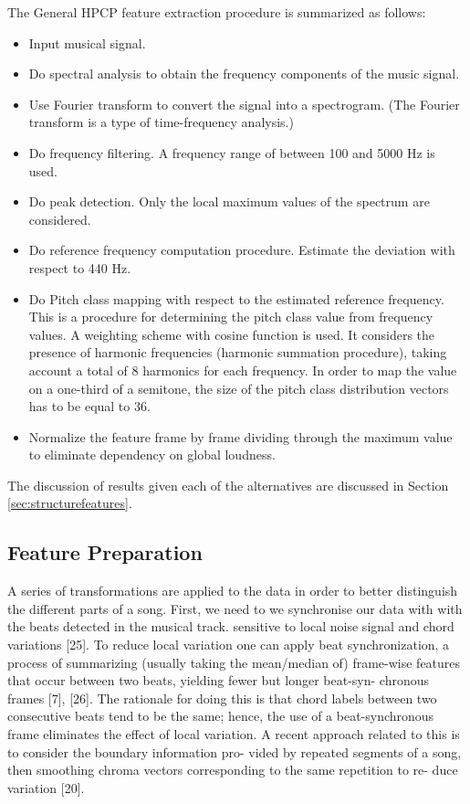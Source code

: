 The General HPCP feature extraction procedure is summarized as follows:
\begin{itemize}
\item Input musical signal.
\item Do spectral analysis to obtain the frequency components of the music signal.
\item Use Fourier transform to convert the signal into a spectrogram. (The Fourier transform is a type of time-frequency analysis.)
\item Do frequency filtering. A frequency range of between 100 and 5000 Hz is used.
\item Do peak detection. Only the local maximum values of the spectrum are considered.
\item Do reference frequency computation procedure. Estimate the deviation with respect to 440 Hz.
\item Do Pitch class mapping with respect to the estimated reference frequency. This is a procedure for determining the pitch class value from frequency values. A weighting scheme with cosine function is used. It considers the presence of harmonic frequencies (harmonic summation procedure), taking account a total of 8 harmonics for each frequency. In order to map the value on a one-third of a semitone, the size of the pitch class distribution vectors has to be equal to 36.
\item Normalize the feature frame by frame dividing through the maximum value to eliminate dependency on global loudness.
\end{itemize}

The discussion of results given each of the alternatives are discussed in Section \ref{sec:structurefeatures}.

\vspace{10pt}

\subsection{Feature Preparation}

A series of transformations are applied to the data in order to better distinguish the different parts of a song. First, we need to we synchronise our data with with the beats detected in the musical track. sensitive to local noise signal and chord variations [25]. To reduce local variation one can apply beat synchronization, a process of summarizing (usually taking the mean/median of) frame-wise features that occur between two beats, yielding fewer but longer beat-syn- chronous frames [7], [26]. The rationale for doing this is that chord labels between two consecutive beats tend to be the same; hence, the use of a beat-synchronous frame eliminates the effect of local variation. A recent approach related to this is to consider the boundary information pro- vided by repeated segments of a song, then smoothing chroma vectors corresponding to the same repetition to re- duce variation [20].


